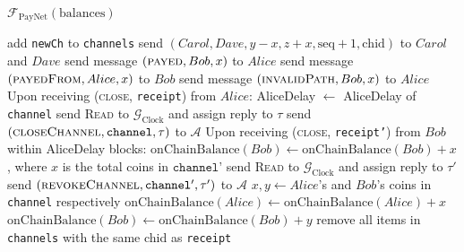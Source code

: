 \begin{functionality}{$\mathcal{F}_{\mathrm{PayNet}}
\left(\mathrm{balances}\right)$}
\begin{algorithmic}[1]
          \State add \texttt{newCh} to \texttt{channels}
          \State send $\left(Carol, Dave, y - x, z + x, \mathrm{seq} + 1,
          \mathrm{chid}\right)$ to $Carol$ and $Dave$ 
        \EndFor
        \State send message $\left(\textsc{payed}, Bob, x\right)$ to $Alice$
        \State send message $\left(\textsc{payedFrom}, Alice, x\right)$ to $Bob$
      \Else
        \State send message $\left(\textsc{invalidPath}, Bob, x\right)$ to
        $Alice$
      \EndIf
    \EndIndent
    \State
    \State Upon receiving (\textsc{close}, \texttt{receipt}) from $Alice$:
    \Indent
        \State AliceDelay $\gets$ AliceDelay of \texttt{channel}
        \State send \textsc{Read} to $\mathcal{G}_{\mathrm{Clock}}$ and assign
        reply to $\tau$
        \State send $\left(\textsc{closeChannel}, \mathtt{channel},
        \tau\right)$ to $\mathcal{A}$
        \State Upon receiving (\textsc{close}, \texttt{receipt'}) from $Bob$
        within AliceDelay blocks: 
          \State $\mathrm{onChainBalance}\left(Bob\right) \gets
          \mathrm{onChainBalance}\left(Bob\right) + x$, where $x$ is the total
          coins in $\texttt{channel'}$
          \State send \textsc{Read} to $\mathcal{G}_{\mathrm{Clock}}$ and assign
          reply to $\tau'$
          \State send $\left(\textsc{revokeChannel}, \mathtt{channel'},
          \tau'\right)$ to $\mathcal{A}$
        \Else
          \State $x, y \gets Alice$'s and $Bob$'s coins in \texttt{channel}
          respectively
          \State $\mathrm{onChainBalance}\left(Alice\right) \gets
          \mathrm{onChainBalance}\left(Alice\right) + x$
          \State $\mathrm{onChainBalance}\left(Bob\right) \gets
          \mathrm{onChainBalance}\left(Bob\right) + y$
        \EndIf
        \State remove all items in \texttt{channels} with the same chid as
        \texttt{receipt}
      \EndIf
    \EndIndent
  \end{algorithmic}
\end{functionality}
